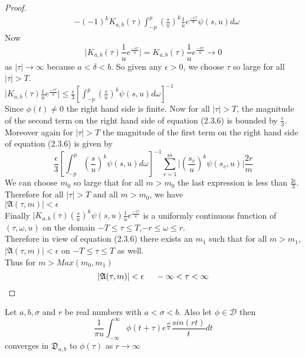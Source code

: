 \begin{proof}
\begin{align}
&-(-1)^{k}K_{a,b}(\tau)\int_{-p}^{p}(\frac{s}{u})^{k}\frac{1}{u}e^{\frac{-s\tau}{u}}\psi(s,u)d\omega
 \end{align}
 Now 
 \begin{equation*}
 \vert K_{a,b}(\tau)\frac{1}{u}e^{\frac{-s\tau}{u}}\vert = K_{a,b}(\tau) \frac{1}{u}e^{\frac{-\sigma\tau}{u}}\rightarrow 0
 \end{equation*}
 as $ \vert \tau \vert \rightarrow \infty $ because $a<\delta<b$. So given any $\epsilon > 0$, we choose $\tau$ so large for all $ \vert \tau \vert > T $.\\
 $ \vert K_{a,b}(\tau)\frac{1}{u}e^{\frac{-s\tau}{u}}\vert \leq \frac{\epsilon}{3} [\int_{-p}^{p}(\frac{s}{u})^{k}\psi(s,u)d\omega]^{-1} $\\
 Since $ \phi(t)\neq 0 $ the right hand side is finite. Now for all $ \vert \tau \vert > T $, the magnitude of the second term on the right hand side of equation (2.3.6) is bounded by $ \frac{\epsilon}{3} $. Moreover again for $ \vert \tau \vert > T $ the magnitude of the first term on the right hand side of equation (2.3.6) is given by
 \begin{equation}
 \frac{\epsilon}{3} [\int_{-p}^{p}(\frac{s}{u})^{k}\psi(s,u)d\omega]^{-1}\sum_{v=1}^{m}\vert (\frac{s_{v}}{u})^{k}\psi(s_{v},u) \vert \frac{2r}{m}
 \end{equation}
 We can choose $ m_{0} $ so large that for all $ m > m_{0} $ the last expression is less than $ \frac{2\epsilon}{3} $. Therefore for all $ \vert \tau \vert > T $ and all $ m > m_{0} $, we have\\
 $ \vert \mathfrak{A}(\tau,m)\vert < \epsilon $\\
 Finally $ \vert K_{a,b}(\tau)(\frac{s}{u})^{k}\psi(s,u)\frac{1}{u}e^{\frac{-s\tau}{u}} $ is a uniformly continuous function of $(\tau,\omega,u)$ on the domain $ -T \leq \tau \leq T $,$ -r \leq\omega \leq r $.\\
 Therefore in view of equation (2.3.6) there exists an $m_{1}$ such that for all $ m>m_{1} $, $ \vert \mathfrak{A}(\tau,m)\vert < \epsilon $ on $ -T \leq \tau \leq T $ as well.\\
 Thus for $ m > {Max}(m_{0},m_{1}) $
 \begin{equation}
  \vert \mathfrak{A}(\tau,m)\vert < \epsilon \hspace{0.5cm} -\infty <\tau < \infty 
 \end{equation}
 \end{proof}  
 
 \begin{lemma}
 Let $ a,b,\sigma $ and $r$ be real numbers with $ a<\sigma<b $. Also let $\phi \in \mathcal{D}$ then
 \begin{equation}
 \frac{1}{\pi u}\int_{-\infty}^{\infty}\phi(t+\tau)e^{\frac{\sigma t}{u}}\frac{sin(rt)}{t}dt
 \end{equation}
 converges in $\mathfrak{D}_{a,b}$ to $\phi(\tau)$ as $r\rightarrow \infty$
 \end{lemma}
 
